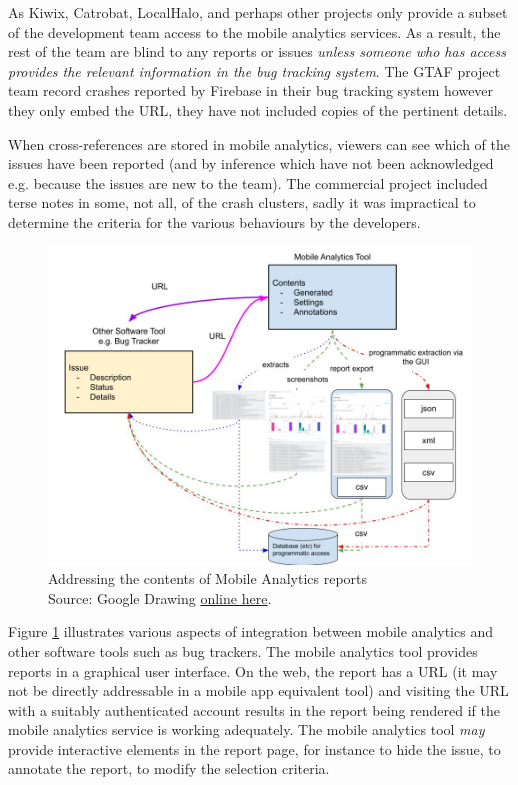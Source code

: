 As Kiwix, Catrobat, LocalHalo, and perhaps other projects only provide a subset of the development team access to the mobile analytics services. As a result, the rest of the team are blind to any reports or issues \textit{unless someone who has access provides the relevant information in the bug tracking system}. The GTAF project team record crashes reported by Firebase in their bug tracking system however they only embed the URL, they have not included copies of the pertinent details.

When cross-references are stored in mobile analytics, viewers can see which of the issues have been reported (and by inference which have not been acknowledged e.g. because the issues are new to the team). The commercial project included terse notes in some, not all, of the crash clusters, sadly it was impractical to determine the criteria for the various behaviours by the developers. 

\begin{figure}
    \centering
    \includegraphics[width=\textwidth]{images/rough-sketches/integration-of-mobile-analytics-tool.jpeg}
    \caption[Addressing the contents of Mobile Analytics reports]{Addressing the contents of Mobile Analytics reports\\Source: Google Drawing \href{https://docs.google.com/drawings/d/1y7QP8UK7ugl0DzWIeH4udRxwsVMHjyQ6Am0qW6glkdE/edit?usp=sharing}{online here}.}
    \label{fig:addressing-the-contents-of-mobile-analytics}
\end{figure}

Figure \ref{fig:addressing-the-contents-of-mobile-analytics} illustrates various aspects of integration between mobile analytics and other software tools such as bug trackers. The mobile analytics tool provides reports in a graphical user interface. On the web, the report has a URL (it may not be directly addressable in a mobile app equivalent tool) and visiting the URL with a suitably authenticated account results in the report being rendered if the mobile analytics service is working adequately. The mobile analytics tool \emph{may} provide interactive elements in the report page, for instance to hide the issue, to annotate the report, to modify the selection criteria. 

